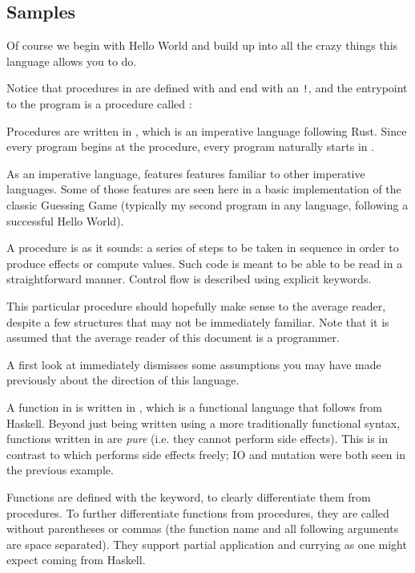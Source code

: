 \subsection{Samples}

Of course we begin with Hello World and build up into all the crazy things this
language allows you to do.

Notice that procedures in \Trilogy{} are defined with  and end with an
\texttt{!}, and the entrypoint to the program is a procedure called :


Procedures are written in \Prose{}, which is an imperative language following Rust.
Since every program begins at the  procedure, every program naturally starts
in \Prose{}.

As an imperative language, \Prose{} features features familiar to other imperative
languages. Some of those features are seen here in a basic implementation of the
classic Guessing Game (typically my second program in any language, following a
successful Hello World).


A procedure is as it sounds: a series of steps to be taken in sequence in order
to produce effects or compute values. Such code is meant to be able to be read
in a straightforward manner. Control flow is described using explicit keywords.

This particular procedure should hopefully make sense to the average reader,
despite a few structures that may not be immediately familiar. Note that it is
assumed that the average reader of this document is a programmer.

A first look at \Poetry{} immediately dismisses some assumptions you may have
made previously about the direction of this language.


A function in \Trilogy{} is written in \Poetry{}, which is a functional
language that follows from Haskell. Beyond just being written using a more
traditionally functional syntax, functions written in \Poetry{} are \emph{pure}
(i.e. they cannot perform side effects). This is in contrast to \Prose{} which
performs side effects freely; IO and mutation were both seen in the previous
example.

Functions are defined with the  keyword, to clearly differentiate them
from procedures. To further differentiate functions from procedures, they are called
without parentheses or commas (the function name and all following arguments are space
separated). They support partial application and currying as one might expect coming
from Haskell.

